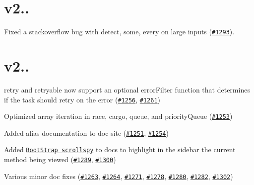 \section*{v2..}


\begin{DoxyItemize}
\item Fixed a stackoverflow bug with {\ttfamily detect}, {\ttfamily some}, {\ttfamily every} on large inputs (\href{https://github.com/caolan/async/issues/1293}{\tt \#1293}).
\end{DoxyItemize}

\section*{v2..}


\begin{DoxyItemize}
\item {\ttfamily retry} and {\ttfamily retryable} now support an optional {\ttfamily error\+Filter} function that determines if the {\ttfamily task} should retry on the error (\href{https://github.com/caolan/async/issues/1256}{\tt \#1256}, \href{https://github.com/caolan/async/issues/1261}{\tt \#1261})
\item Optimized array iteration in {\ttfamily race}, {\ttfamily cargo}, {\ttfamily queue}, and {\ttfamily priority\+Queue} (\href{https://github.com/caolan/async/issues/1253}{\tt \#1253})
\item Added alias documentation to doc site (\href{https://github.com/caolan/async/issues/1251}{\tt \#1251}, \href{https://github.com/caolan/async/issues/1254}{\tt \#1254})
\item Added \href{http://getbootstrap.com/javascript/#scrollspy}{\tt Boot\+Strap scrollspy} to docs to highlight in the sidebar the current method being viewed (\href{https://github.com/caolan/async/issues/1289}{\tt \#1289}, \href{https://github.com/caolan/async/issues/1300}{\tt \#1300})
\item Various minor doc fixes (\href{https://github.com/caolan/async/issues/1263}{\tt \#1263}, \href{https://github.com/caolan/async/issues/1264}{\tt \#1264}, \href{https://github.com/caolan/async/issues/1271}{\tt \#1271}, \href{https://github.com/caolan/async/issues/1278}{\tt \#1278}, \href{https://github.com/caolan/async/issues/1280}{\tt \#1280}, \href{https://github.com/caolan/async/issues/1282}{\tt \#1282}, \href{https://github.com/caolan/async/issues/1302}{\tt \#1302})
\end{DoxyItemize}


